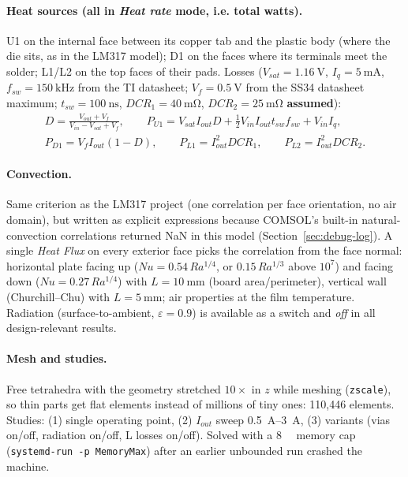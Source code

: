 \documentclass[11pt,letterpaper]{article}
\begin{document}
\paragraph{Heat sources (all in \textit{Heat rate} mode, i.e. total watts).}
U1 on the internal face between its copper tab and the plastic body (where the die sits, as in the LM317
model); D1 on the faces where its terminals meet the solder; L1/L2 on the top faces of their pads. Losses
($V_{sat}=\SI{1.16}{\volt}$, $I_q=\SI{5}{\milli\ampere}$, $f_{sw}=\SI{150}{\kilo\hertz}$ from the TI
datasheet; $V_f=\SI{0.5}{\volt}$ from the SS34 datasheet maximum; $t_{sw}=\SI{100}{\nano\second}$,
$DCR_1=\SI{40}{\milli\ohm}$, $DCR_2=\SI{25}{\milli\ohm}$ \textbf{assumed}):
\begin{gather*}
D=\frac{V_{out}+V_f}{V_{in}-V_{sat}+V_f},\qquad
P_{U1}=V_{sat}I_{out}D+\tfrac12 V_{in}I_{out}t_{sw}f_{sw}+V_{in}I_q,\\
P_{D1}=V_f I_{out}(1-D),\qquad P_{L1}=I_{out}^2 DCR_1,\qquad P_{L2}=I_{out}^2 DCR_2 .
\end{gather*}

\paragraph{Convection.} Same criterion as the LM317 project (one correlation per face orientation, no air
domain), but written as explicit expressions because COMSOL's built-in natural-convection correlations
returned NaN in this model (Section~\ref{sec:debug-log}). A single \textit{Heat Flux} on every exterior
face picks the correlation from the face normal: horizontal plate facing up
($Nu=0.54\,Ra^{1/4}$, or $0.15\,Ra^{1/3}$ above $10^7$) and facing down ($Nu=0.27\,Ra^{1/4}$) with
$L=\SI{10}{\milli\meter}$ (board area/perimeter), vertical wall (Churchill--Chu) with
$L=\SI{5}{\milli\meter}$; air properties at the film temperature. Radiation (surface-to-ambient,
$\varepsilon=0.9$) is available as a switch and \emph{off} in all design-relevant results.

\paragraph{Mesh and studies.} Free tetrahedra with the geometry stretched $10\times$ in $z$ while meshing
(\texttt{zscale}), so thin parts get flat elements instead of millions of tiny ones: 110,446 elements.
Studies: (1) single operating point, (2) $I_{out}$ sweep \SIrange{0.5}{3}{\ampere}, (3) variants
(vias on/off, radiation on/off, L losses on/off). Solved with a \SI{8}{\giga\byte} memory cap
(\texttt{systemd-run -p MemoryMax}) after an earlier unbounded run crashed the machine.
\end{document}
